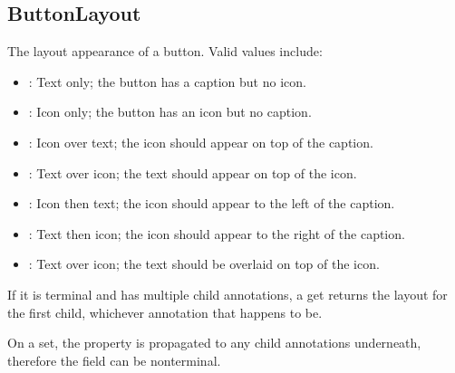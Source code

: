 \documentclass[letterpaper,12pt,english,openany,oneside]{sphinxmanual}
\begin{document}
\begin{sphinxVerbatim}[commandchars=\\\{\}]
  
\end{sphinxVerbatim}




\subsection{ButtonLayout}
\label{\detokenize{IAC_API_FormsIntro:buttonlayout}}
The layout appearance of a button. Valid values include:
\begin{itemize}
\item {} 
: Text only; the button has a caption but no icon.

\item {} 
: Icon only; the button has an icon but no caption.

\item {} 
: Icon over text; the icon should appear on top of the caption.

\item {} 
: Text over icon; the text should appear on top of the icon.

\item {} 
: Icon then text; the icon should appear to the left of the caption.

\item {} 
: Text then icon; the icon should appear to the right of the caption.

\item {} 
: Text over icon; the text should be overlaid on top of the icon.

\end{itemize}

If it is terminal and has multiple child annotations, a get returns the layout for the first child, whichever annotation that happens to be.

On a set, the property is propagated to any child annotations underneath, therefore the field can be non\sphinxhyphen{}terminal.

\label{\detokenize{IAC_API_FormsIntro:syntax-13}}

\begin{sphinxVerbatim}[commandchars=\\\{\}]
\PYG{p}{[}\PYG{p}{]} 
\end{sphinxVerbatim}
\label{\detokenize{IAC_API_FormsIntro:exceptions-8}}
\end{document}
